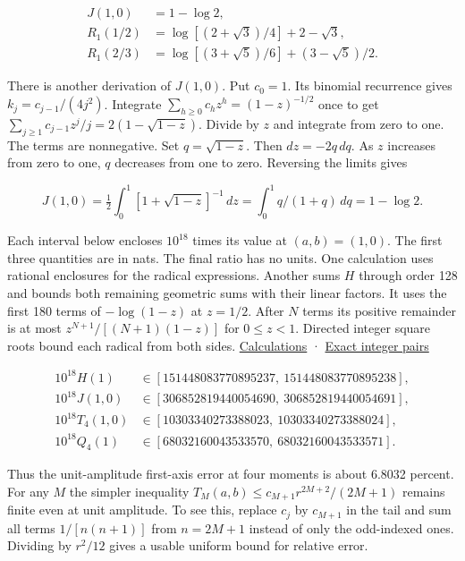 \[
\begin{aligned}
J(1,0)&=1-\log2,\\
R_1(1/2)&=\log[(2+\sqrt3)/4]+2-\sqrt3,\\
R_1(2/3)&=\log[(3+\sqrt5)/6]+(3-\sqrt5)/2.
\end{aligned}
\]

There is another derivation of \(J(1,0)\). Put \(c_0=1\). Its binomial recurrence gives \(k_j=c_{j-1}/(4j^2)\). Integrate \(\sum_{h\ge0}c_hz^h=(1-z)^{-1/2}\) once to get \(\sum_{j\ge1}c_{j-1}z^j/j=2(1-\sqrt{1-z})\). Divide by \(z\) and integrate from zero to one. The terms are nonnegative. Set \(q=\sqrt{1-z}\). Then \(dz=-2q\,dq\). As \(z\) increases from zero to one, \(q\) decreases from one to zero. Reversing the limits gives

\[
J(1,0)=\tfrac12\int_0^1[1+\sqrt{1-z}]^{-1}\,dz=\int_0^1 q/(1+q)\,dq=1-\log2.
\]

Each interval below encloses \(10^{18}\) times its value at \((a,b)=(1,0)\). The first three quantities are in nats. The final ratio has no units. One calculation uses rational enclosures for the radical expressions. Another sums \(H\) through order 128 and bounds both remaining geometric sums with their linear factors. It uses the first 180 terms of \(-\log(1-z)\) at \(z=1/2\). After \(N\) terms its positive remainder is at most \(z^{N+1}/[(N+1)(1-z)]\) for \(0\le z<1\). Directed integer square roots bound each radical from both sides. \href{https://github.com/sepahead/pid-rs/blob/main/audit/research/angular-unit-boundary/boundary.py}{Calculations} · \href{https://github.com/sepahead/pid-rs/blob/main/audit/research/angular-unit-boundary/boundary-values.json}{Exact integer pairs}

\[
\begin{aligned}
10^{18}H(1) &\in [151448083770895237,\ 151448083770895238],\\
10^{18}J(1,0) &\in [306852819440054690,\ 306852819440054691],\\
10^{18}T_4(1,0) &\in [10303340273388023,\ 10303340273388024],\\
10^{18}Q_4(1) &\in [68032160043533570,\ 68032160043533571].
\end{aligned}
\]

Thus the unit-amplitude first-axis error at four moments is about 6.8032 percent. For any \(M\) the simpler inequality \(T_M(a,b)\le c_{M+1} r^{2M+2}/(2M+1)\) remains finite even at unit amplitude. To see this, replace \(c_j\) by \(c_{M+1}\) in the tail and sum all terms \(1/[n(n+1)]\) from \(n=2M+1\) instead of only the odd-indexed ones. Dividing by \(r^2/12\) gives a usable uniform bound for relative error.

